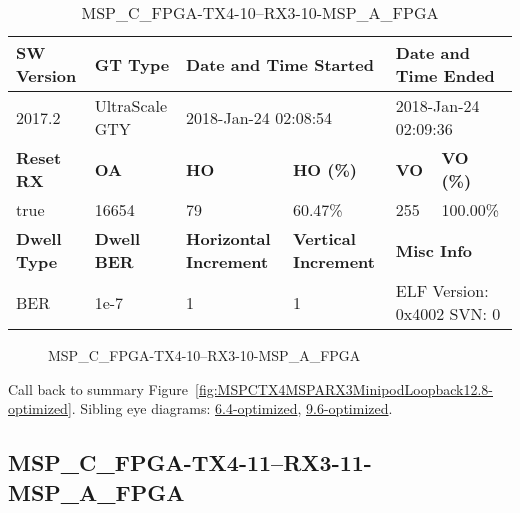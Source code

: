 \begin{table}[h]
\centering
\caption{MSP\_C\_FPGA-TX4-10--RX3-10-MSP\_A\_FPGA}
\label{tab:MSPCFPGATX410RX310MSPAFPGA12.8-optimized}
\begin{tabular}{@{}|l|l|l|l|l|l|@{}}
\toprule
\textbf{SW Version}                & \textbf{GT Type}   & \multicolumn{2}{l|}{\textbf{Date and Time Started}}            & \multicolumn{2}{l|}{\textbf{Date and Time Ended}}        \\ \midrule
2017.2                       & UltraScale GTY          & \multicolumn{2}{l|}{2018-Jan-24 02:08:54}                   & \multicolumn{2}{l|}{2018-Jan-24 02:09:36}               \\ \midrule
\textbf{Reset RX}                  & \textbf{OA} & \textbf{HO}   & \textbf{HO (\%)} & \textbf{VO} & \textbf{VO (\%)} \\ \midrule
true & 16654        & 79          & 60.47\%        & 255        & 100.00\%       \\ \midrule
\textbf{Dwell Type}                & \textbf{Dwell BER} & \textbf{Horizontal Increment} & \textbf{Vertical Increment}    & \multicolumn{2}{l|}{\textbf{Misc Info}}                  \\ \midrule
BER                            & 1e-7        & 1        & 1           & \multicolumn{2}{l|}{ELF Version: 0x4002 SVN: 0}                         \\ \bottomrule
\end{tabular}
\end{table}

\begin{figure}[h]
\caption{MSP\_C\_FPGA-TX4-10--RX3-10-MSP\_A\_FPGA} \label{fig:MSPCFPGATX410RX310MSPAFPGA12.8-optimized}
\end{figure}

Call back to summary Figure~\ref{fig:MSPCTX4MSPARX3MinipodLoopback12.8-optimized}.
Sibling eye diagrams: \hyperref[sec:MSPCFPGATX410RX310MSPAFPGA6.4-optimized]{6.4-optimized}, \hyperref[sec:MSPCFPGATX410RX310MSPAFPGA9.6-optimized]{9.6-optimized}.

\clearpage
\newpage


\subsection{MSP\_C\_FPGA-TX4-11--RX3-11-MSP\_A\_FPGA}\label{sec:MSPCFPGATX411RX311MSPAFPGA12.8-optimized}

